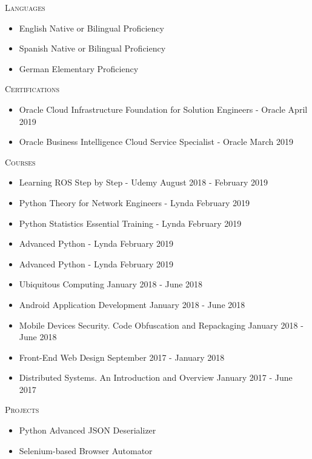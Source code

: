 \documentclass[11pt]{article}
\renewcommand{\section}[1]
{\vspace{1.0\baselineskip}{\Large\textbf{#1}}}
\begin{document}


\section{Skills}

\textsc{Languages}
\begin{itemize}
    \item[] English \hfill Native or Bilingual Proficiency
    \item[] Spanish \hfill Native or Bilingual Proficiency
    \item[] German \hfill Elementary Proficiency
\end{itemize}

\textsc{Certifications}
\begin{itemize}
    \item[] Oracle Cloud Infrastructure Foundation for Solution Engineers - Oracle \hfill April 2019
    \item[] Oracle Business Intelligence Cloud Service Specialist - Oracle \hfill March 2019
\end{itemize}

\textsc{Courses}
\begin{itemize}
    \item[] Learning ROS Step by Step - Udemy \hfill August 2018 - February 2019
    \item[] Python Theory for Network Engineers - Lynda \hfill February 2019
    \item[] Python Statistics Essential Training - Lynda \hfill February 2019
    \item[] Advanced Python - Lynda \hfill February 2019
    \item[] Advanced Python - Lynda \hfill February 2019
    \item[] Ubiquitous Computing \hfill January 2018 - June 2018
    \item[] Android Application Development \hfill January 2018 - June 2018
    \item[] Mobile Devices Security. Code Obfuscation and Repackaging \hfill January 2018 - June 2018
    \item[] Front-End Web Design \hfill September 2017 - January 2018
    \item[] Distributed Systems. An Introduction and Overview \hfill January 2017 - June 2017
\end{itemize}

\textsc{Projects}
\begin{itemize}
    \item[] Python Advanced JSON Deserializer
    \item[] Selenium-based Browser Automator
\end{itemize}
\end{document}
